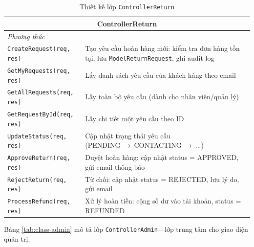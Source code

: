 \documentclass[../DoAn.tex]{subfiles}
\begin{document}
\begin{table}[H]
\centering
\caption{Thiết kế lớp \texttt{ControllerReturn}}
\label{tab:class-return}
\scriptsize
\begin{tabular}{|p{4cm}|p{9cm}|}
\hline
\multicolumn{2}{|c|}{\textbf{ControllerReturn}} \\
\hline
\multicolumn{2}{|l|}{\textit{Phương thức}} \\
\hline
\texttt{CreateRequest(req, res)} & Tạo yêu cầu hoàn hàng mới: kiểm tra đơn hàng tồn tại, lưu \break \texttt{ModelReturnRequest}, ghi audit log \\
\hline
\texttt{GetMyRequests(req, res)} & Lấy danh sách yêu cầu của khách hàng theo email \\
\hline
\texttt{GetAllRequests(req, res)} & Lấy toàn bộ yêu cầu (dành cho nhân viên/quản lý) \\
\hline
\texttt{GetRequestById(req, res)} & Lấy chi tiết một yêu cầu theo ID \\
\hline
\texttt{UpdateStatus(req, res)} & Cập nhật trạng thái yêu cầu (PENDING~→~CONTACTING~→~...) \\
\hline
\texttt{ApproveReturn(req, res)} & Duyệt hoàn hàng: cập nhật status = APPROVED, gửi email thông báo \\
\hline
\texttt{RejectReturn(req, res)} & Từ chối: cập nhật status = REJECTED, lưu lý do, gửi email \\
\hline
\texttt{ProcessRefund(req, res)} & Xử lý hoàn tiền: cộng số dư vào tài khoản, status = REFUNDED \\
\hline
\end{tabular}
\end{table}

Bảng \ref{tab:class-admin} mô tả lớp \texttt{ControllerAdmin}---lớp trung
tâm cho giao diện quản trị.
\end{document}

